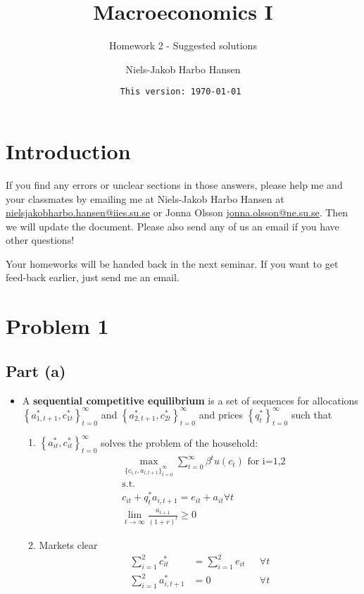 \documentclass{scrartcl}
\begin{document}
\pagestyle{fancy}
\fancyhead{}
\fancyhead[LE,RO]{\thepage}
\fancyfoot{}

\title{Macroeconomics I}
\subtitle{Homework 2 - Suggested solutions}
\author{Niels-Jakob Harbo Hansen}
\date{\texttt{This version: \today {} \currenttime}}
\maketitle

\section*{Introduction}
If you find any errors or unclear sections in those answers, please help me and your classmates by emailing me at Niels-Jakob Harbo Hansen at \url{nielsjakobharbo.hansen@iies.su.se} or Jonna Olsson \url{jonna.olsson@ne.su.se}. Then we will update the document. Please also send any of us an email if you have other questions! 

Your homeworks will be handed back in the next seminar. If you want to get feed-back earlier, just send me an email. 

\section*{Problem 1}

\subsection*{Part (a)}

\begin{itemize}
\item A \textbf{sequential competitive equilibrium} is a set of sequences for allocations $\left\{a_{1,t+1}^*, c_{1t}^*\right\}_{t=0}^{\infty}$ and $\left\{a_{2,t+1}^*, c_{2t}^*\right\}_{t=0}^{\infty}$ and prices $\left\{q_{t}^*\right\}_{t=0}^{\infty}$ such that 
	
	\begin{enumerate}
		\item $\left\{a_{it}^*, c_{it}^*\right\}_{t=0}^{\infty}$ solves the problem of the household:
		\begin{align}
		&\max_{\{{c_{i,t}, a_{i,t+1}}\}_{t=0}^{\infty}} {\sum_{t=0}^{\infty} \beta^t u(c_t)} \text{ for i=1,2}\\
		&\text{s.t. } \nonumber \\ 
		&c_{it}+q_t^* a_{i,t+1}=e_{it}+a_{it} \forall t \nonumber \\
		& \lim_{t \rightarrow \infty} \frac{a_{t+1}}{(1+r)^t} \geq 0 \nonumber 
		\end{align}
		\item Markets clear
		\begin{align}
		\sum_{i=1}^{2} c_{it}^*&=\sum_{i=1}^{2} e_{it} \text{ } &\forall t \\
		\sum_{i=1}^{2} a_{i,t+1}^*&=0 \text{ } &\forall t 
		\end{align}
	\end{enumerate}
	
\end{itemize}
\end{document}
